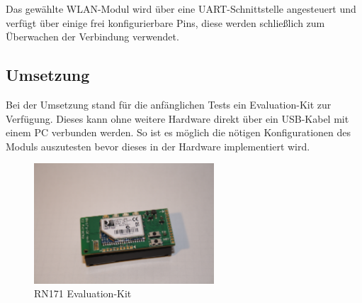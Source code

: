   Das gewählte WLAN-Modul wird über eine UART-Schnittstelle angesteuert und verfügt über einige frei konfigurierbare Pins, diese werden schließlich zum Überwachen der
  Verbindung verwendet.

  \subsection{Umsetzung}
  Bei der Umsetzung stand für die anfänglichen Tests ein Evaluation-Kit zur Verfügung. Dieses kann ohne weitere Hardware direkt über ein USB-Kabel mit einem PC verbunden werden.
  So ist es möglich die nötigen Konfigurationen des Moduls auszutesten bevor dieses in der Hardware implementiert wird.

  \begin{figure}[H]
    \begin{centering}
      \includegraphics[width = 0.6\textwidth]{Bilder/RN171_EK}
    \par\end{centering}
    \caption[RN171 Evaluation-Kit]{RN171 Evaluation-Kit\cite{RN171_EK_source}}
    \label{RN171_EK}
  \end{figure}

